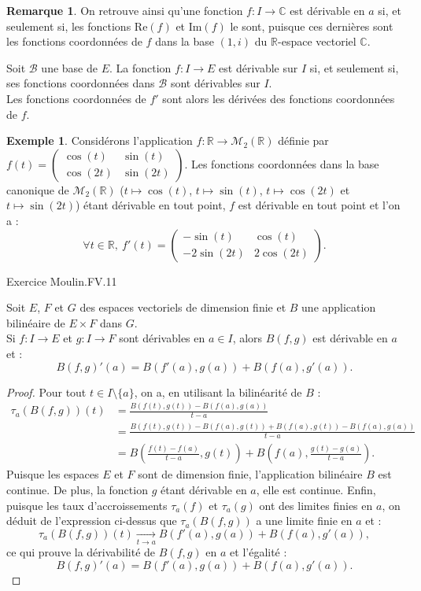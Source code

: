 \documentclass[french]{article}
\newcommand{\R}{\mathbb{R}}
\newcommand{\C}{\mathbb{C}}
\theoremstyle{plain}
\theoremstyle{definition}
\newtheorem*{ex}{Exemple}
\newtheorem*{rmq}{Remarque}
\theoremstyle{remark}
\begin{document}
\begin{rmq}
	On retrouve ainsi qu'une fonction $f:I\to \C$ est dérivable en $a$ si, et seulement si, les fonctions $\text{Re}(f)$ et $\text{Im}(f)$ le sont, puisque ces dernières sont les fonctions coordonnées de $f$ dans la base $(1,i)$ du $\R$-espace vectoriel $\C$.
\end{rmq}

\begin{prop}%
	Soit $\mathcal{B}$ une base de $E$. La fonction $f:I\to E$ est dérivable sur $I$ si, et seulement si, ses fonctions coordonnées dans $\mathcal{B}$ sont dérivables sur $I$.\\
	Les fonctions coordonnées de $f'$ sont alors les dérivées des fonctions coordonnées de $f$.
\end{prop}

\begin{ex}
	Considérons l'application $f:\R\to\mathcal{M}_2(\R)$ définie par $f(t)=\begin{pmatrix}
		\cos(t)&\sin(t)\\
		\cos(2t)&\sin(2t)
	\end{pmatrix}$. Les fonctions coordonnées dans la base canonique de $\mathcal{M}_2(\R)$ ($t\mapsto\cos(t)$, $t\mapsto\sin(t)$, $t\mapsto\cos(2t)$ et $t\mapsto\sin(2t)$) étant dérivable en tout point, $f$ est dérivable en tout point et l'on a :
	$$\forall t\in\R,\ f'(t)=\begin{pmatrix}
		-\sin(t)&\cos(t)\\
		-2\sin(2t)&2\cos(2t)
	\end{pmatrix}.$$
\end{ex}

Exercice Moulin.FV.11

\begin{prop}%
	Soit $E$, $F$ et $G$ des espaces vectoriels de dimension finie et $B$ une application bilinéaire de $E\times F$ dans $G$.\\
	Si $f:I\to E$ et $g:I\to F$ sont dérivables en $a\in I$, alors $B(f,g)$ est dérivable en $a$ et :
	$$B(f,g)'(a)=B(f'(a),g(a))+B(f(a),g'(a)).$$
\end{prop}
\begin{proof}
	Pour tout $t\in I\setminus\{a\}$, on a, en utilisant la bilinéarité de $B$ :
	\begin{align*}
		\tau_a(B(f,g))(t)&=\frac{B(f(t),g(t))-B(f(a),g(a))}{t-a}\\
		&=\frac{B(f(t),g(t))-B(f(a),g(t))+B(f(a),g(t))-B(f(a),g(a))}{t-a}\\
		&=B\left(\frac{f(t)-f(a)}{t-a},g(t)\right)+B\left(f(a),\frac{g(t)-g(a)}{t-a}\right).
	\end{align*}
	Puisque les espaces $E$ et $F$ sont de dimension finie, l'application bilinéaire $B$ est continue. De plus, la fonction $g$ étant dérivable en $a$, elle est continue. Enfin, puisque les taux d'accroissements $\tau_a(f)$ et $\tau_a(g)$ ont des limites finies en $a$, on déduit de l'expression ci-dessus que $\tau_a(B(f,g))$ a une limite finie en $a$ et :
	$$\tau_a(B(f,g))(t)\xrightarrow[t\to a]{}B(f'(a),g(a))+B(f(a),g'(a)),$$
	ce qui prouve la dérivabilité de $B(f,g)$ en $a$ et l'égalité :
	$$B(f,g)'(a)=B(f'(a),g(a))+B(f(a),g'(a)).$$
\end{proof}
\end{document}
